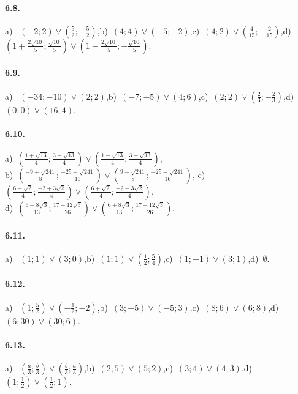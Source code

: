 \paragraph{6.8.} a)~ $\left(-2;2\right)\vee \left(\frac 5 2;-\frac 5 2\right)$,\quad b)~$\left(4;4\right)\vee \left(-5;-2\right)$,\quad c)~$\left(4;2\right)\vee \left(\frac 4{15};-\frac 2{15}\right)$,\quad d)~$\left(1+\frac{2\sqrt{10}} 5;\frac{\sqrt{10}} 5\right)\vee \left(1-\frac{2\sqrt{10}} 5;-\frac{\sqrt{10}} 5\right)$.

\paragraph{6.9.} a)~ $(-34;-10)\vee (2;2)$,\quad b)~$(-7;-5)\vee (4;6)$,\quad c)~$(2;2)\vee \left(\frac 2{3};-\frac 2{3}\right)$,\quad d)~$(0;0)\vee (16;4)$.

\paragraph{6.10.} a)~$\left(\frac{1+\sqrt{13}} 4;\frac{3-\sqrt{13}} 4\right)\vee \left(\frac{1-\sqrt{13}} 4;\frac{3+\sqrt{13}} 4\right)$,\protect\\
b)~$\left(\frac{-9+\sqrt{241}} 8;\frac{-25+\sqrt{241}}{16}\right)\vee \left(\frac{9-\sqrt{241}} 8;\frac{-25-\sqrt{241}}{16}\right)$,\quad
c)~$\left(\frac{6-\sqrt 2} 4;\frac{-2+3\sqrt 2} 4\right)\vee \left(\frac{6+\sqrt 2} 4;\frac{-2-3\sqrt 2} 4\right)$,\protect\\ d)~$\left(\frac{6-8\sqrt 3}{13};\frac{17+12\sqrt 3}{26}\right)\vee\left(\frac{6+ 8\sqrt 3}{13};\frac{17-12\sqrt 3}{26}\right)$.

\paragraph{6.11.} a)~ $(1;1)\vee (3;0)$,\quad b)~$(1;1)\vee \left(\frac{1}{2};\frac{5}{4}\right)$,\quad c)~$(1;-1)\vee (3;1)$,\quad d)~$\emptyset$.

\paragraph{6.12.} a)~ $\left(1;\frac{5}{2}\right)\vee \left(-\frac{1}{2};-2\right)$,\quad b)~$(3;-5)\vee (-5;3)$,\quad c)~$(8;6)\vee (6;8)$,\quad d)~$(6;30)\vee (30;6)$.

\paragraph{6.13.} a)~ $\left(\frac{a}{3};\frac{b}{3}\right)\vee \left(\frac{b}{3};\frac{a}{3}\right)$,\quad b)~$(2;5)\vee (5;2)$,\quad c)~$(3;4)\vee (4;3)$,\quad d)~$\left(1;\frac{1}{2}\right)\vee \left(\frac{1}{2};1\right)$.

